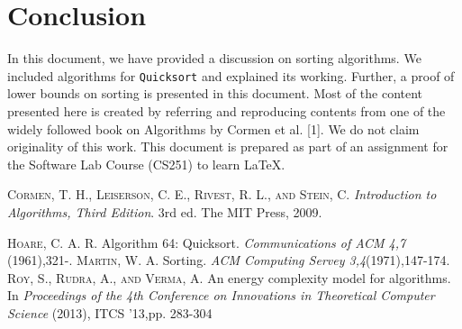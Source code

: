 \documentclass[a4paper, 15pt,twocolumn]{article}
\begin{document}
\section{Conclusion}
In this document, we have provided a discussion
on sorting algorithms. We included algorithms for
\texttt{Quicksort} and explained its working. Further, a
proof of lower bounds on sorting is presented in this
document. Most of the content presented here is
created by referring and reproducing contents from
one of the widely followed book on Algorithms by
Cormen et al. [1]. We do not claim originality of
this work. This document is prepared as part of an
assignment for the Software Lab Course (CS251) to
learn \LaTeX.



\begin{thebibliography}{9}
\textsc{Cormen, T. H., Leiserson, C. E., Rivest, R. L., and Stein, C.}
\textit{Introduction to Algorithms, Third Edition}. 
3rd ed. The MIT Press, 2009.
 
\textsc{Hoare, C. A. R.} Algorithm 64: Quicksort.
\textit{Communications of ACM 4,7}
(1961),321-.
\textsc{Martin, W. A.} Sorting.
\textit{ACM Computing Servey 3,4}(1971),147-174.
\textsc{Roy, S., Rudra, A., and Verma, A.} 
An energy complexity model for algorithms. In
\textit{Proceedings of the 4th Conference on Innovations in Theoretical Computer Science }(2013), ITCS '13,pp. 283-304
\end{thebibliography}
\end{document}
